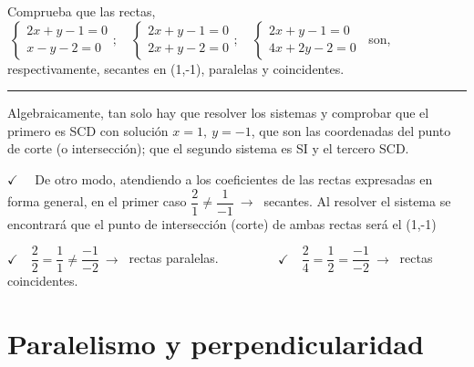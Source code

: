 \begin{miejercicio}

Comprueba que las rectas, $\ \begin{cases} 2x+y-1=0 \\ x-y-2=0 \end{cases};\quad \begin{cases} 2x+y-1=0 \\ 2x+y-2=0 \end{cases};\quad  \begin{cases} 2x+y-1=0 \\ 4x+2y-2=0 \end{cases}\ $ son, respectivamente, secantes en (1,-1), paralelas y coincidentes.

\rule{250pt}{0.1pt}

\vspace{2mm} Algebraicamente, tan solo hay que resolver los sistemas y comprobar que el primero es SCD con solución $x=1,\ y=-1$, que son las coordenadas del punto de corte (o intersección); que el segundo sistema es SI y el tercero SCD.	

\begin{footnotesize}
\vspace{5mm} $\checkmark\quad$ De otro modo, atendiendo a los coeficientes de las rectas expresadas en forma general, en el primer caso $\dfrac{2}{1} \neq \dfrac{1}{-1} \ \to \ $ secantes. Al resolver el sistema se encontrará que el punto de intersección (corte) de ambas rectas será el (1,-1)

\vspace{3mm} $\checkmark\quad \dfrac{2}{2}=\dfrac{1}{1}\neq\dfrac{-1}{-2} \ \to \ $ rectas paralelas.
$\qquad \qquad $
$\checkmark\quad \dfrac{2}{4}=\dfrac{1}{2}=\dfrac{-1}{-2} \ \to \ $ rectas  coincidentes.
\end{footnotesize}
\end{miejercicio}





\vspace{0.5cm}
\section{Paralelismo y perpendicularidad}
\vspace{0.2cm}


